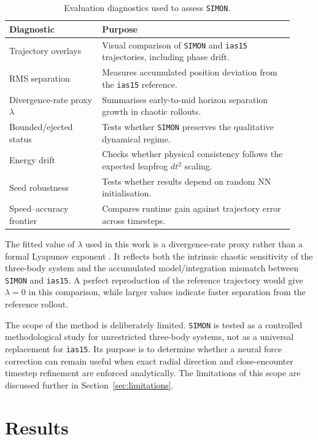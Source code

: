 \documentclass[12pt]{article}
\begin{document}
\begin{table}[H]
\centering
\caption{Evaluation diagnostics used to assess \texttt{SIMON}.}
\label{tab:evaluation_strategy}
\begin{tabular}{@{}p{0.30\linewidth}p{0.62\linewidth}@{}}
\toprule
\textbf{Diagnostic} & \textbf{Purpose} \\
\midrule
Trajectory overlays & Visual comparison of \texttt{SIMON} and \texttt{ias15} trajectories, including phase drift. \\
RMS separation & Measures accumulated position deviation from the \texttt{ias15} reference. \\
Divergence-rate proxy $\lambda$ & Summarises early-to-mid horizon separation growth in chaotic rollouts. \\
Bounded/ejected status & Tests whether \texttt{SIMON} preserves the qualitative dynamical regime. \\
Energy drift & Checks whether physical consistency follows the expected leapfrog $dt^2$ scaling. \\
Seed robustness & Tests whether results depend on random NN initialisation. \\
Speed--accuracy frontier & Compares runtime gain against trajectory error across timesteps. \\
\bottomrule
\end{tabular}
\end{table}

The fitted value of $\lambda$ used in this work is a divergence-rate proxy rather than a
formal Lyapunov exponent \citep{sep-chaos}. It reflects both the intrinsic chaotic sensitivity
of the three-body system and the accumulated model/integration mismatch between
\texttt{SIMON} and \texttt{ias15}. A perfect reproduction of the reference trajectory would give
$\lambda=0$ in this comparison, while larger values indicate faster separation from the
reference rollout.

The scope of the method is deliberately limited. \texttt{SIMON} is tested as a controlled
methodological study for unrestricted three-body systems, not as a universal replacement for
\texttt{ias15}. Its purpose is to determine whether a neural force correction can remain useful
when exact radial direction and close-encounter timestep refinement are enforced analytically.
The limitations of this scope are discussed further in Section~\ref{sec:limitations}.

\section{Results}
\label{sec:results}
\end{document}
